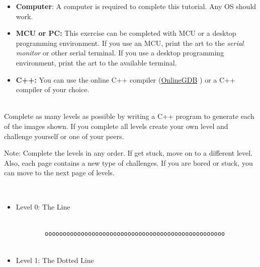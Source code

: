 \documentclass[12pt]{article}
\begin{document}
\begin{description}[labelindent=1cm]
	
	\item[\textbf{\underline{System Requirements:}}] \hfill \vspace{0mm}

\begin{itemize}
	\item {\bf Computer}: A computer is required to complete this tutorial. Any OS should work.
	\item {\bf MCU or PC:} This exercise can be completed with MCU or a desktop programming environment. If you use an MCU, print the art to the {\it serial monitor} or other serial terminal. If you use a desktop programming environment, print the art to the available terminal.
	
	\item {\bf C++:} You can use the online C++ compiler (\href{https://www.onlinegdb.com/online\_c++\_compiler}{OnlineGDB} ) or a C++ compiler of your choice.
\end{itemize}

	\item[\textbf{\underline{Problem Statement:}}] \hfill \vspace{0mm} \\
	Complete as many levels as possible by writing a C++ program to generate each of the images shown. If you complete all levels create your own level and challenge yourself or one of your peers.
	
	Note: Complete the levels in any order. If get stuck, move on to a different level. Also, each page contains a new type of challenges. If you are bored or stuck, you can move to the next page of levels.  
	
\newpage	
	
	\item[\textbf{\underline{The Levels:}}] \hfill \vspace{0mm} \\
	\begin{itemize}

		\item Level 0: The Line
		
		\begin{lstlisting}
		
		oooooooooooooooooooooooooooooooooooooooooooooooooo
		
		\end{lstlisting}
		
		\item Level 1: The Dotted Line
		
		\begin{lstlisting}
		

\end{lstlisting}
\end{itemize}
\end{description}
\end{document}
